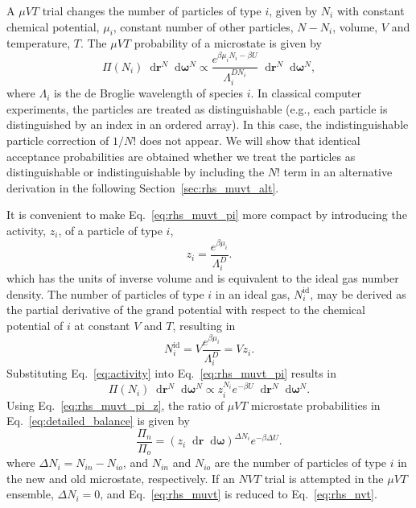 \documentclass[
  9pt,
  bestpractices,
  pubversion,
]{livecoms}
\newcommand*\diff{\mathop{}\!\mathrm{d}}
\begin{document}
A $\mu VT$ trial changes the number of particles of type $i$, given by $N_i$ with constant chemical potential, $\mu_i$, constant number of other particles, $N-N_i$, volume, $V$ and temperature, $T$.
The $\mu VT$ probability of a microstate is given by \cite{norman_investigation_1969, adams_grand_1975, allen_computer_1989, frenkel_understanding_2002}
\begin{equation}
\Pi(N_i) \diff\mathbf{r}^N \diff\boldsymbol{\omega}^N\propto \frac{e^{\beta\mu_i N_i - \beta U}}{\Lambda_i^{DN_i}} \diff\mathbf{r}^N\diff\boldsymbol{\omega}^N,
\label{eq:rhs_muvt_pi}
\end{equation}
where $\Lambda_i$ is the de Broglie wavelength of species $i$.
In classical computer experiments, the particles are treated as distinguishable (e.g., each particle is distinguished by an index in an ordered array).
In this case, the indistinguishable particle correction of $1/N!$ does not appear.
We will show that identical acceptance probabilities are obtained whether we treat the particles as distinguishable or indistinguishable by including the $N!$ term in an alternative derivation in the following Section~\ref{sec:rhs_muvt_alt}.

It is convenient to make Eq.~\ref{eq:rhs_muvt_pi} more compact by introducing the activity, $z_i$, of a particle of type $i$,
\begin{equation}
z_i = \frac{e^{\beta \mu_i}}{\Lambda_i^D}.
\label{eq:activity}
\end{equation}
which has the units of inverse volume and is equivalent to the ideal gas number density.
The number of particles of type $i$ in an ideal gas, $N_{i}^{\mathrm{id}}$, may be derived as the partial derivative of the grand potential with respect to the chemical potential of $i$ at constant $V$ and $T$, resulting in
\begin{equation}
N_{i}^{\mathrm{id}} = V\frac{e^{\beta \mu_i}}{\Lambda_i^D} = Vz_i.
\label{eq:gce_ideal_gas_density}
\end{equation}
Substituting Eq.~\ref{eq:activity} into Eq.~\ref{eq:rhs_muvt_pi} results in
\begin{equation}
\Pi(N_i) \diff\mathbf{r}^N \diff\boldsymbol{\omega}^N\propto z_i^{N_i} e^{-\beta U} \diff\mathbf{r}^N\diff\boldsymbol{\omega}^N.
\label{eq:rhs_muvt_pi_z}
\end{equation}
Using Eq.~\ref{eq:rhs_muvt_pi_z}, the ratio of $\mu VT$ microstate probabilities in Eq.~\ref{eq:detailed_balance} is given by
\begin{equation}
\frac{\Pi_n}{\Pi_o} = (z_i\diff\mathbf{r}\diff\boldsymbol{\omega})^{\Delta N_i} e^{-\beta\Delta U}.
\label{eq:rhs_muvt}
\end{equation}
where $\Delta N_i = N_{in} - N_{io}$, and $N_{in}$ and $N_{io}$ are the number of particles of type $i$ in the new and old microstate, respectively.
If an $NVT$ trial is attempted in the $\mu VT$ ensemble, $\Delta N_i=0$, and Eq.~\ref{eq:rhs_muvt} is reduced to Eq.~\ref{eq:rhs_nvt}.
\end{document}
